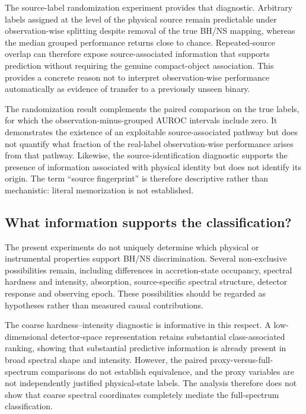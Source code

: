 \documentclass[final,5p,authoryear,nopreprintline]{elsarticle}
\begin{document}
The source-label randomization experiment provides that diagnostic. Arbitrary labels assigned at the level of the physical source remain predictable under observation-wise splitting despite removal of the true BH/NS mapping, whereas the median grouped performance returns close to chance. Repeated-source overlap can therefore expose source-associated information that supports prediction without requiring the genuine compact-object association. This provides a concrete reason not to interpret observation-wise performance automatically as evidence of transfer to a previously unseen binary.

The randomization result complements the paired comparison on the true labels, for which the observation-minus-grouped AUROC intervals include zero. It demonstrates the existence of an exploitable source-associated pathway but does not quantify what fraction of the real-label observation-wise performance arises from that pathway. Likewise, the source-identification diagnostic supports the presence of information associated with physical identity but does not identify its origin. The term ``source fingerprint'' is therefore descriptive rather than mechanistic: literal memorization is not established.

\subsection{What information supports the classification?}

The present experiments do not uniquely determine which physical or instrumental properties support BH/NS discrimination. Several non-exclusive possibilities remain, including differences in accretion-state occupancy, spectral hardness and intensity, absorption, source-specific spectral structure, detector response and observing epoch. These possibilities should be regarded as hypotheses rather than measured causal contributions.

The coarse hardness--intensity diagnostic is informative in this respect. A low-dimensional detector-space representation retains substantial class-associated ranking, showing that substantial predictive information is already present in broad spectral shape and intensity. However, the paired proxy-versus-full-spectrum comparisons do not establish equivalence, and the proxy variables are not independently justified physical-state labels. The analysis therefore does not show that coarse spectral coordinates completely mediate the full-spectrum classification.
\end{document}

